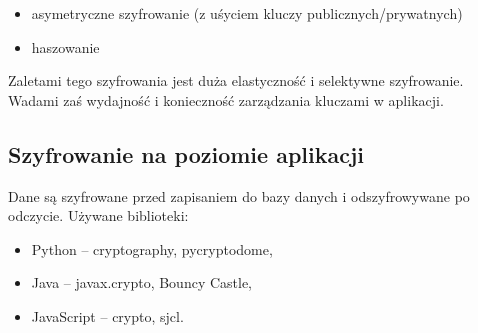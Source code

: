 \documentclass[a4paper,11pt,polish]{sphinxmanual}
\begin{document}
\begin{sphinxVerbatim}[commandchars=\\\{\}]
  
  
\end{sphinxVerbatim}
\begin{itemize}
\item {} 
\sphinxAtStartPar
asymetryczne szyfrowanie (z uśyciem kluczy publicznych/prywatnych)

\item {} 
\sphinxAtStartPar
haszowanie

\end{itemize}

\begin{sphinxVerbatim}[commandchars=\\\{\}]
  
\end{sphinxVerbatim}

\sphinxAtStartPar
Zaletami tego szyfrowania jest duża elastyczność i selektywne szyfrowanie. Wadami zaś wydajność i konieczność zarządzania kluczami w aplikacji.


\subsection{Szyfrowanie na poziomie aplikacji}
\label{\detokenize{Bezpieczenstwo/index:szyfrowanie-na-poziomie-aplikacji}}
\sphinxAtStartPar
Dane są szyfrowane przed zapisaniem do bazy danych i odszyfrowywane po odczycie. Używane biblioteki:
\begin{itemize}
\item {} 
\sphinxAtStartPar
Python – cryptography, pycryptodome,

\item {} 
\sphinxAtStartPar
Java – javax.crypto, Bouncy Castle,

\item {} 
\sphinxAtStartPar
JavaScript – crypto, sjcl.

\end{itemize}
\end{document}
